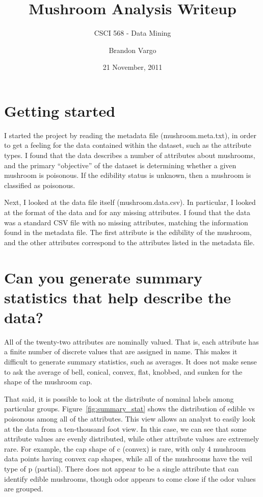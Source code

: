 \documentclass[margin,letterpaper,11pt]{scrartcl}
\begin{document}
\setlength{\pdfpageheight}{\paperheight}
\setlength{\pdfpagewidth}{\paperwidth}

\title{Mushroom Analysis Writeup}
\subtitle{CSCI 568 - Data Mining}
\date{21 November, 2011}
\author{Brandon Vargo}
\maketitle

\section{Getting started}

I started the project by reading the metadata file (mushroom.meta.txt), in
order to get a feeling for the data contained within the dataset, such as the
attribute types. I found that the data describes a number of attributes about
mushrooms, and the primary ``objective'' of the dataset is determining whether
a given mushroom is poisonous. If the edibility status is unknown, then a
mushroom is classified as poisonous.

Next, I looked at the data file itself (mushroom.data.csv). In particular, I
looked at the format of the data and for any missing attributes. I found that
the data was a standard CSV file with no missing attributes, matching the
information found in the metadata file. The first attribute is the edibility
of the mushroom, and the other attributes correspond to the attributes listed
in the metadata file.

\section{Can you generate summary statistics that help describe the data?}

All of the twenty-two attributes are nominally valued. That is, each attribute
has a finite number of discrete values that are assigned in name. This makes
it difficult to generate summary statistics, such as averages. It does not
make sense to ask the average of bell, conical, convex, flat, knobbed, and
sunken for the shape of the mushroom cap.

That said, it is possible to look at the distribute of nominal labels among
particular groups. Figure~\ref{fig:summary_stat} shows the distribution of edible
vs poisonous among all of the attributes. This view allows an analyst to
easily look at the data from a ten-thousand foot view. In this case, we can
see that some attribute values are evenly distributed, while other attribute
values are extremely rare. For example, the cap shape of c (convex) is rare,
with only 4 mushroom data points having convex cap shapes, while all of the
mushrooms have the veil type of p (partial). There does not appear to be a
single attribute that can identify edible mushrooms, though odor appears to
come close if the odor values are grouped.
\end{document}
